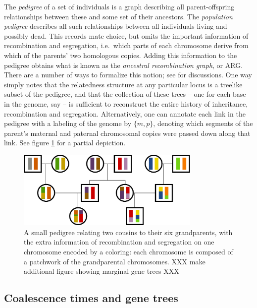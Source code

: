 The \emph{pedigree} of a set of individuals is a graph 
describing all parent-offspring relationships between these
and some set of their ancestors.
The \emph{population pedigree} describes all such relationships
between all individuals living and possibly dead.
This records mate choice,
but omits the important information of recombination and segregation,
i.e.\ which parts of each chromosome derive from which of the parents' two homologous copies.
Adding this information to the pedigree obtains what is known as the \emph{ancestral recombination graph}, or ARG.
There are a number of ways to formalize this notion;
see \citep{griffiths1997ancestral,hudson1990gene} for discussions.
One way simply notes that the relatedness structure at any particular locus
is a treelike subset of the pedigree,
and that the collection of these trees -- one for each base in the genome, say --
is sufficient to reconstruct the entire history of inheritance, recombination and segregation.
Alternatively, one can annotate each link in the pedigree with a labeling of the genome by $\{m,p\}$,
denoting which segments of the parent's maternal and paternal chromosomal copies were passed down along that link.
See figure \ref{fig:pedigree_ibd} for a partial depiction.

\begin{figure}[ht!]
  \begin{center}
    \includegraphics[width=3.5in]{pedigree-ibd-recombination}
  \end{center}
  \caption{
  A small pedigree relating two cousins to their six grandparents,
  with the extra information of recombination and segregation on one chromosome
  encoded by a coloring: each chromosome is composed
  of a patchwork of the grandparental chromosomes.
  XXX make additional figure showing marginal gene trees XXX
  \label{fig:pedigree_ibd}
  }
\end{figure}

\subsection{Coalescence times and gene trees}

